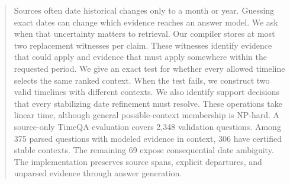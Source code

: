 \begin{abstract}
Sources often date historical changes only to a month or year.
Guessing exact dates can change which evidence reaches an answer model.
We ask when that uncertainty matters to retrieval.
Our compiler stores at most two replacement witnesses per claim.
These witnesses identify evidence that could apply and evidence that must apply somewhere within the requested period.
We give an exact test for whether every allowed timeline selects the same ranked context.
When the test fails, we construct two valid timelines with different contexts.
We also identify support decisions that every stabilizing date refinement must resolve.
These operations take linear time, although general possible-context membership is NP-hard.
A source-only TimeQA evaluation covers 2,348 validation questions.
Among 375 parsed questions with modeled evidence in context, 306 have certified stable contexts.
The remaining 69 expose consequential date ambiguity.
The implementation preserves source spans, explicit departures, and unparsed evidence through answer generation.
\end{abstract}
